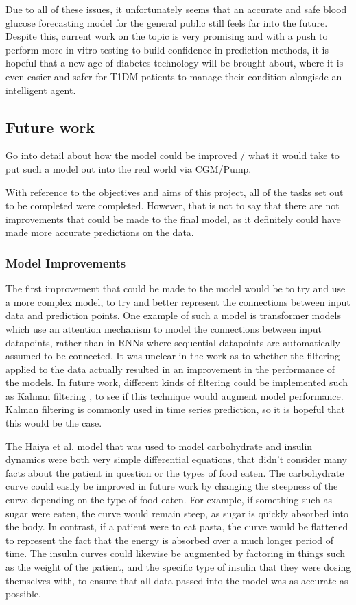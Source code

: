         Due to all of these issues, it unfortunately seems that an accurate and safe blood glucose forecasting model for the general public still feels far into the future. Despite this, current work on the topic is very promising and with a push to perform more in vitro testing to build confidence in prediction methods, it is hopeful that a new age of diabetes technology will be brought about, where it is even easier and safer for T1DM patients to manage their condition alongisde an intelligent agent.
	
	\subsection{Future work}
        Go into detail about how the model could be improved / what it would take to put such a model out into the real world via CGM/Pump.
        
        With reference to the objectives and aims of this project, all of the tasks set out to be completed were completed. However, that is not to say that there are not improvements that could be made to the final model, as it definitely could have made more accurate predictions on the data.

        \subsubsection{Model Improvements}
          The first improvement that could be made to the model would be to try and use a more complex model, to try and better represent the connections between input data and prediction points. One example of such a model is transformer models \cite{transformer} which use an attention mechanism to model the connections between input datapoints, rather than in RNNs where sequential datapoints are automatically assumed to be connected. It was unclear in the work as to whether the filtering applied to the data actually resulted in an improvement in the performance of the models. In future work, different kinds of filtering could be implemented such as Kalman filtering \cite{kalman}, to see if this technique would augment model performance. Kalman filtering is commonly used in time series prediction, so it is hopeful that this would be the case.

          The Haiya et al. \cite{haiya} model that was used to model carbohydrate and insulin dynamics were both very simple differential equations, that didn't consider many facts about the patient in question or the types of food eaten. The carbohydrate curve could easily be improved in future work by changing the steepness of the curve depending on the type of food eaten. For example, if something such as sugar were eaten, the curve would remain steep, as sugar is quickly absorbed into the body. In contrast, if a patient were to eat pasta, the curve would be flattened to represent the fact that the energy is absorbed over a much longer period of time. The insulin curves could likewise be augmented by factoring in things such as the weight of the patient, and the specific type of insulin that they were dosing themselves with, to ensure that all data passed into the model was as accurate as possible.

